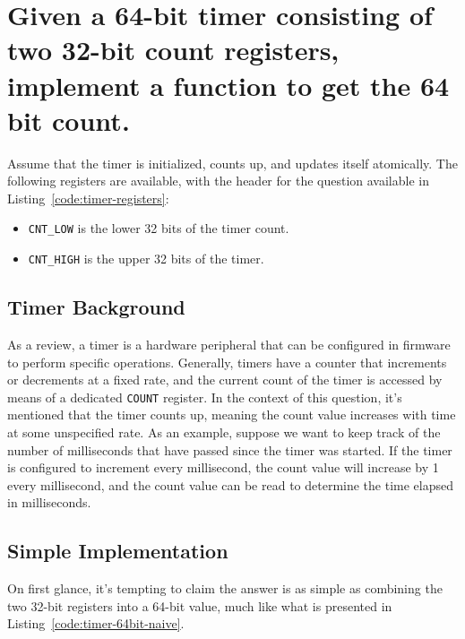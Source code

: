 \documentclass[main.tex]{subfiles}
\begin{document}
\section{Given a 64-bit timer consisting of two 32-bit count registers, implement a function to get the 64 bit count.}
Assume that the timer is initialized, counts up, and updates itself atomically. The following registers are available, with the header for the question available in Listing~\ref{code:timer-registers}:
\begin{itemize}
    \item \texttt{CNT\_LOW} is the lower 32 bits of the timer count.
    \item \texttt{CNT\_HIGH} is the upper 32 bits of the timer.
\end{itemize}



\spoilerline

\subsection{Timer Background}
As a review, a timer is a hardware peripheral that can be configured in firmware to perform specific operations. Generally, timers have a counter that increments or decrements at a fixed rate, and the current count of the timer is accessed by means of a dedicated \texttt{COUNT} register. In the context of this question, it's mentioned that the timer counts up, meaning the count value increases with time at some unspecified rate. As an example, suppose we want to keep track of the number of milliseconds that have passed since the timer was started. If the timer is configured to increment every millisecond, the count value will increase by 1 every millisecond, and the count value can be read to determine the time elapsed in milliseconds.

\subsection{Simple Implementation}
On first glance, it's tempting to claim the answer is as simple as combining the two 32-bit registers into a 64-bit value, much like what is presented in Listing~\ref{code:timer-64bit-naive}.


\end{document}
